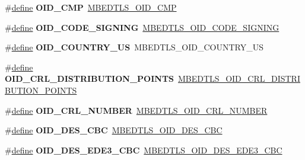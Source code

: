 \begin{DoxyCompactItemize}
\#\hyperlink{structdefine}{define} {\bfseries O\+I\+D\+\_\+\+C\+MP}~\hyperlink{asn1_8h_a0b81f225b3551ec7c4da69b2d183d10b}{M\+B\+E\+D\+T\+L\+S\+\_\+\+O\+I\+D\+\_\+\+C\+MP}
\item 
\mbox{\label{compat-1_83_8h_ae9dee7f4c77075347830faabe9255b16}} 
\#\hyperlink{structdefine}{define} {\bfseries O\+I\+D\+\_\+\+C\+O\+D\+E\+\_\+\+S\+I\+G\+N\+I\+NG}~\hyperlink{oid_8h_a009e8dcda015bc2320261a1faf6e066a}{M\+B\+E\+D\+T\+L\+S\+\_\+\+O\+I\+D\+\_\+\+C\+O\+D\+E\+\_\+\+S\+I\+G\+N\+I\+NG}
\item 
\mbox{\label{compat-1_83_8h_af1cac94c1d85ce021e8f6b9c7643defb}} 
\#\hyperlink{structdefine}{define} {\bfseries O\+I\+D\+\_\+\+C\+O\+U\+N\+T\+R\+Y\+\_\+\+US}~M\+B\+E\+D\+T\+L\+S\+\_\+\+O\+I\+D\+\_\+\+C\+O\+U\+N\+T\+R\+Y\+\_\+\+US
\item 
\mbox{\label{compat-1_83_8h_a537e5d1b64118f338d38e40d9e6ffece}} 
\#\hyperlink{structdefine}{define} {\bfseries O\+I\+D\+\_\+\+C\+R\+L\+\_\+\+D\+I\+S\+T\+R\+I\+B\+U\+T\+I\+O\+N\+\_\+\+P\+O\+I\+N\+TS}~\hyperlink{oid_8h_a8184fdce4edfcc2cccc03eedc5a195c8}{M\+B\+E\+D\+T\+L\+S\+\_\+\+O\+I\+D\+\_\+\+C\+R\+L\+\_\+\+D\+I\+S\+T\+R\+I\+B\+U\+T\+I\+O\+N\+\_\+\+P\+O\+I\+N\+TS}
\item 
\mbox{\label{compat-1_83_8h_a7861cf0cb3c6db1d16f0cc84b353846c}} 
\#\hyperlink{structdefine}{define} {\bfseries O\+I\+D\+\_\+\+C\+R\+L\+\_\+\+N\+U\+M\+B\+ER}~\hyperlink{oid_8h_a1c760658437633541572c413a2856ac4}{M\+B\+E\+D\+T\+L\+S\+\_\+\+O\+I\+D\+\_\+\+C\+R\+L\+\_\+\+N\+U\+M\+B\+ER}
\item 
\mbox{\label{compat-1_83_8h_a3820cfd911996e1b585c81130dffef7f}} 
\#\hyperlink{structdefine}{define} {\bfseries O\+I\+D\+\_\+\+D\+E\+S\+\_\+\+C\+BC}~\hyperlink{oid_8h_ab9e4760b2ab848c9b6096d2068c194e6}{M\+B\+E\+D\+T\+L\+S\+\_\+\+O\+I\+D\+\_\+\+D\+E\+S\+\_\+\+C\+BC}
\item 
\mbox{\label{compat-1_83_8h_a16ffb3be871a2c85bd68452dc69bf554}} 
\#\hyperlink{structdefine}{define} {\bfseries O\+I\+D\+\_\+\+D\+E\+S\+\_\+\+E\+D\+E3\+\_\+\+C\+BC}~\hyperlink{oid_8h_a87a6b55d263cb7c94f7d96acc90af328}{M\+B\+E\+D\+T\+L\+S\+\_\+\+O\+I\+D\+\_\+\+D\+E\+S\+\_\+\+E\+D\+E3\+\_\+\+C\+BC}
\item 

\end{DoxyCompactItemize}
